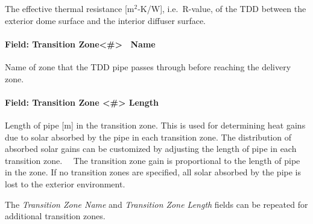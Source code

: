 The effective thermal resistance {[}m\(^{2}\)-K/W{]}, i.e.~R-value, of the TDD between the exterior dome surface and the interior diffuser surface.

\paragraph{Field: Transition Zone\textless{}\#\textgreater{}~ Name}\label{field-transition-zone-name}

Name of zone that the TDD pipe passes through before reaching the delivery zone.

\paragraph{Field: Transition Zone \textless{}\#\textgreater{} Length}\label{field-transition-zone-length}

Length of pipe {[}m{]} in the transition zone. This is used for determining heat gains due to solar absorbed by the pipe in each transition zone. The distribution of absorbed solar gains can be customized by adjusting the length of pipe in each transition zone.~~ The transition zone gain is proportional to the length of pipe in the zone. If no transition zones are specified, all solar absorbed by the pipe is lost to the exterior environment.

The \emph{Transition Zone Name} and \emph{Transition Zone Length} fields can be repeated for additional transition zones.

